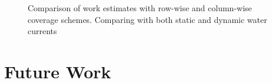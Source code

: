 \documentclass{tamuccthesis}
\begin{document}
\begin{figure}
    \caption[]{\small Comparison of work estimates with row-wise and column-wise coverage schemes. Comparing with both static and dynamic water currents} 
    \label{fig:coverage_noterrain_work}
    
\end{figure}


\chapter{Future Work}

\end{document}
